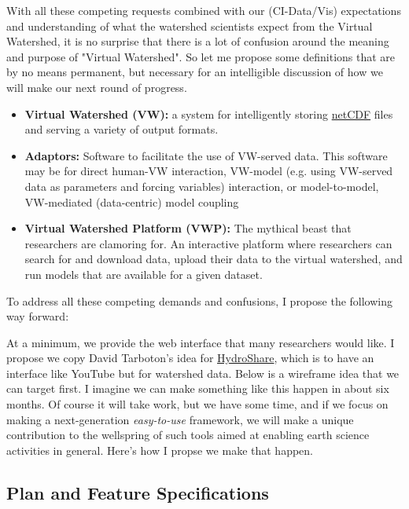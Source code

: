\documentclass[
11pt, %
a4paper, %
oneside, %
twoside, %
headinclude,footinclude, %
BCOR5mm, %
]{scrartcl}
\begin{document}
With all these competing requests combined with our (CI-Data/Vis) expectations and understanding
of what the watershed scientists expect from the Virtual Watershed, it is no surprise that
there is a lot of confusion around the meaning and purpose of "Virtual Watershed". So let me
propose some definitions that are by no means permanent, but necessary for an intelligible discussion
of how we will make our next round of progress.

\begin{itemize}
    \item \textbf{Virtual Watershed (VW):} a system for intelligently storing 
        \href{http://www.unidata.ucar.edu/software/netcdf/}{netCDF} files and serving
        a variety of output formats. 
    \item \textbf{Adaptors:} Software to facilitate the use of VW-served data. This software may
        be for direct human-VW interaction, VW-model (e.g. using VW-served data as parameters and 
        forcing variables) interaction, or model-to-model, VW-mediated (data-centric) model 
        coupling
    \item \textbf{Virtual Watershed Platform (VWP):} The mythical beast that researchers are
        clamoring for. An interactive platform where researchers can search for and download data,
        upload their data to the virtual watershed, and run models that are available for a given
        dataset.
\end{itemize}

To address all these competing demands and confusions, I propose the following way forward:

At a minimum, we provide the web interface that many researchers would like. I propose we
copy David Tarboton's idea for \href{http://www.iemss.org/sites/iemss2014/papers/iemss2014_submission_243.pdf}{HydroShare}, 
which is to have an interface like YouTube but for watershed data. Below is a wireframe idea
that we can target first. I imagine we can make something like this happen in about six months. 
Of course it will take work, but we have some time, and if we focus on making a next-generation
\textit{easy-to-use} framework, we will make a unique contribution to the wellspring of such tools
aimed at enabling earth science activities in general. Here's how I propse we make that happen.



\subsection{Plan and Feature Specifications} %
\label{sub:Plan}
\end{document}
